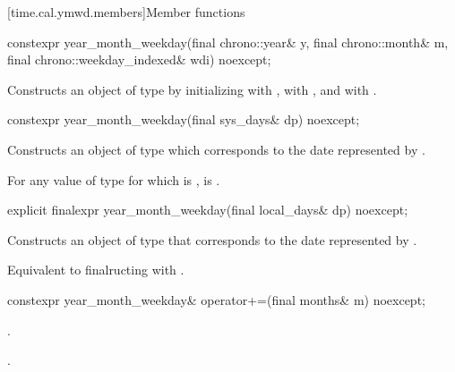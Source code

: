 [time.cal.ymwd.members]{Member functions}

%
\begin{itemdecl}
constexpr year_month_weekday(final chrono::year& y, final chrono::month& m,
                             final chrono::weekday_indexed& wdi) noexcept;
\end{itemdecl}

\begin{itemdescr}
\pnum
\effects
Constructs an object of type  by
initializing  with ,  with , and  with .
\end{itemdescr}

%
\begin{itemdecl}
constexpr year_month_weekday(final sys_days& dp) noexcept;
\end{itemdecl}

\begin{itemdescr}
\pnum
\effects
Constructs an object of type 
which corresponds to the date represented by .

\pnum
\remarks
For any value  of type 
for which  is ,
 is .
\end{itemdescr}

%
\begin{itemdecl}
explicit finalexpr year_month_weekday(final local_days& dp) noexcept;
\end{itemdecl}

\begin{itemdescr}
\pnum
\effects
Constructs an object of type 
that corresponds to the date represented by .

\pnum
\remarks
Equivalent to finalructing with .
\end{itemdescr}

%
\begin{itemdecl}
constexpr year_month_weekday& operator+=(final months& m) noexcept;
\end{itemdecl}

\begin{itemdescr}
\pnum
\effects {}.

\pnum
\returns {}.
\end{itemdescr}

